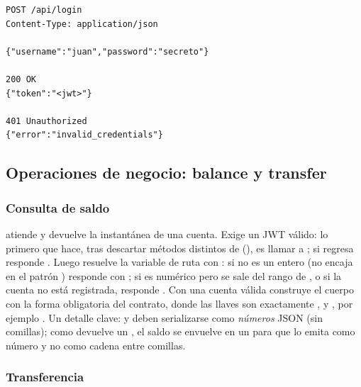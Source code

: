 \begin{lstlisting}[language=none,caption={Contrato JSON de POST /api/login (peticion y respuesta)}]
POST /api/login
Content-Type: application/json

{"username":"juan","password":"secreto"}

200 OK
{"token":"<jwt>"}

401 Unauthorized
{"error":"invalid_credentials"}
\end{lstlisting}

\subsection{Operaciones de negocio: balance y transfer}

\subsubsection*{Consulta de saldo}

 atiende  y
devuelve la instantánea de una cuenta. Exige un JWT válido: lo primero que hace,
tras descartar métodos distintos de  (), es llamar a
; si regresa  responde .
Luego resuelve la variable de ruta  con :
si no es un entero (no encaja en el patrón )
responde  con ; si es numérico pero se
sale del rango de , o si la cuenta no está registrada, responde
. Con una cuenta válida construye el cuerpo con la forma obligatoria
del contrato, donde las llaves son exactamente , 
y , por ejemplo
.
Un detalle clave:  y  deben serializarse como
\emph{números} JSON (sin comillas); como  devuelve un
, el saldo se envuelve en un  para que
 lo emita como número y no como cadena entre comillas.

\subsubsection*{Transferencia}


